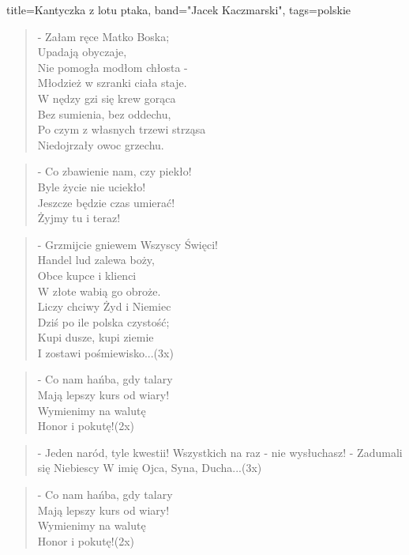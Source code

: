 \documentclass{article}
\begin{document}
\begin{song}{title={Kantyczka z lotu ptaka}, band="Jacek Kaczmarski", tags={polskie}}
\begin{verse}
- Załam ręce Matko Boska; \\
Upadają obyczaje, \\
Nie pomogła modłom chłosta - \\
Młodzież w szranki ciała staje. \\
W nędzy gzi się krew gorąca \\
Bez sumienia, bez oddechu, \\
Po czym z własnych trzewi strząsa \\
Niedojrzały owoc grzechu. \\
\end{verse}

\begin{verse}
- Co zbawienie nam, czy piekło! \\
Byle życie nie uciekło! \\
Jeszcze będzie czas umierać! \\
Żyjmy tu i teraz! \\
\end{verse}

\begin{verse}
- Grzmijcie gniewem Wszyscy Święci! \\
Handel lud zalewa boży, \\
Obce kupce i klienci \\
W złote wabią go obroże. \\
Liczy chciwy Żyd i Niemiec \\
Dziś po ile polska czystość; \\
Kupi dusze, kupi ziemie \\
I zostawi pośmiewisko...(3x) \\
\end{verse}

\begin{verse}
- Co nam hańba, gdy talary \\
Mają lepszy kurs od wiary! \\
Wymienimy na walutę \\
Honor i pokutę!(2x) \\
\end{verse}

\begin{verse}
- Jeden naród, tyle kwestii!
Wszystkich na raz - nie wysłuchasz! -
Zadumali się Niebiescy
W imię Ojca, Syna, Ducha...(3x)
\end{verse}

\begin{verse}
- Co nam hańba, gdy talary \\
Mają lepszy kurs od wiary! \\
Wymienimy na walutę \\
Honor i pokutę!(2x) \\
\end{verse}

\end{song}
\end{document}
